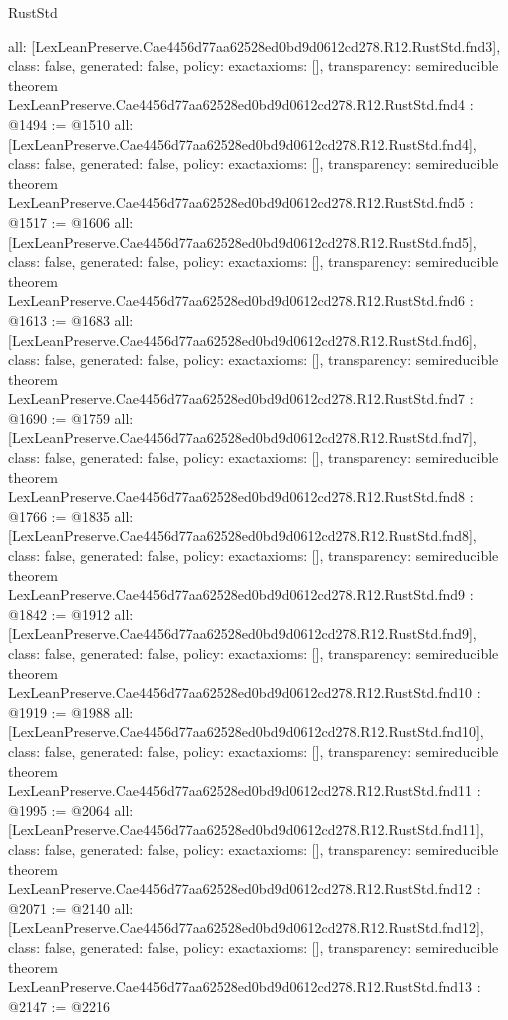 \begin{lexlean}{RustStd}
\begin{coremodule}
{  all: [LexLeanPreserve.Cae4456d77aa62528ed0bd9d0612cd278.R12.RustStd.fnd3],
  class: false,
  generated: false,
  policy: exact{axioms: []},
  transparency: semireducible
}
theorem LexLeanPreserve.Cae4456d77aa62528ed0bd9d0612cd278.R12.RustStd.fnd4 : @1494 := @1510 {
  all: [LexLeanPreserve.Cae4456d77aa62528ed0bd9d0612cd278.R12.RustStd.fnd4],
  class: false,
  generated: false,
  policy: exact{axioms: []},
  transparency: semireducible
}
theorem LexLeanPreserve.Cae4456d77aa62528ed0bd9d0612cd278.R12.RustStd.fnd5 : @1517 := @1606 {
  all: [LexLeanPreserve.Cae4456d77aa62528ed0bd9d0612cd278.R12.RustStd.fnd5],
  class: false,
  generated: false,
  policy: exact{axioms: []},
  transparency: semireducible
}
theorem LexLeanPreserve.Cae4456d77aa62528ed0bd9d0612cd278.R12.RustStd.fnd6 : @1613 := @1683 {
  all: [LexLeanPreserve.Cae4456d77aa62528ed0bd9d0612cd278.R12.RustStd.fnd6],
  class: false,
  generated: false,
  policy: exact{axioms: []},
  transparency: semireducible
}
theorem LexLeanPreserve.Cae4456d77aa62528ed0bd9d0612cd278.R12.RustStd.fnd7 : @1690 := @1759 {
  all: [LexLeanPreserve.Cae4456d77aa62528ed0bd9d0612cd278.R12.RustStd.fnd7],
  class: false,
  generated: false,
  policy: exact{axioms: []},
  transparency: semireducible
}
theorem LexLeanPreserve.Cae4456d77aa62528ed0bd9d0612cd278.R12.RustStd.fnd8 : @1766 := @1835 {
  all: [LexLeanPreserve.Cae4456d77aa62528ed0bd9d0612cd278.R12.RustStd.fnd8],
  class: false,
  generated: false,
  policy: exact{axioms: []},
  transparency: semireducible
}
theorem LexLeanPreserve.Cae4456d77aa62528ed0bd9d0612cd278.R12.RustStd.fnd9 : @1842 := @1912 {
  all: [LexLeanPreserve.Cae4456d77aa62528ed0bd9d0612cd278.R12.RustStd.fnd9],
  class: false,
  generated: false,
  policy: exact{axioms: []},
  transparency: semireducible
}
theorem LexLeanPreserve.Cae4456d77aa62528ed0bd9d0612cd278.R12.RustStd.fnd10 : @1919 := @1988 {
  all: [LexLeanPreserve.Cae4456d77aa62528ed0bd9d0612cd278.R12.RustStd.fnd10],
  class: false,
  generated: false,
  policy: exact{axioms: []},
  transparency: semireducible
}
theorem LexLeanPreserve.Cae4456d77aa62528ed0bd9d0612cd278.R12.RustStd.fnd11 : @1995 := @2064 {
  all: [LexLeanPreserve.Cae4456d77aa62528ed0bd9d0612cd278.R12.RustStd.fnd11],
  class: false,
  generated: false,
  policy: exact{axioms: []},
  transparency: semireducible
}
theorem LexLeanPreserve.Cae4456d77aa62528ed0bd9d0612cd278.R12.RustStd.fnd12 : @2071 := @2140 {
  all: [LexLeanPreserve.Cae4456d77aa62528ed0bd9d0612cd278.R12.RustStd.fnd12],
  class: false,
  generated: false,
  policy: exact{axioms: []},
  transparency: semireducible
}
theorem LexLeanPreserve.Cae4456d77aa62528ed0bd9d0612cd278.R12.RustStd.fnd13 : @2147 := @2216 {
}
\end{coremodule}
\end{lexlean}
